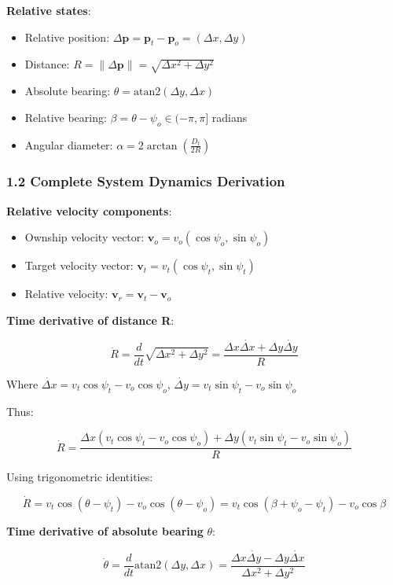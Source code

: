 \documentclass[11pt,a4paper]{article}
\numberwithin{equation}{section}
\begin{document}
\textbf{Relative states}:
\begin{itemize}
\item Relative position: $\Delta\mathbf{p} = \mathbf{p}_t - \mathbf{p}_o = (\Delta x, \Delta y)$
\item Distance: $R = \|\Delta\mathbf{p}\| = \sqrt{\Delta x^2 + \Delta y^2}$
\item Absolute bearing: $\theta = \mathrm{atan2}(\Delta y, \Delta x)$
\item Relative bearing: $\beta = \theta - \psi_o \in (-\pi, \pi]$ radians
\item Angular diameter: $\alpha = 2\arctan\left(\frac{D_t}{2R}\right)$
\end{itemize}

\subsubsection{1.2 Complete System Dynamics Derivation}

\textbf{Relative velocity components}:
\begin{itemize}
\item Ownship velocity vector: $\mathbf{v}_o = v_o(\cos\psi_o, \sin\psi_o)$
\item Target velocity vector: $\mathbf{v}_t = v_t(\cos\psi_t, \sin\psi_t)$
\item Relative velocity: $\mathbf{v}_r = \mathbf{v}_t - \mathbf{v}_o$
\end{itemize}

\textbf{Time derivative of distance R}:

\[
\dot{R} = \frac{d}{dt}\sqrt{\Delta x^2 + \Delta y^2} = \frac{\Delta x \dot{\Delta x} + \Delta y \dot{\Delta y}}{R}
\]

Where $\dot{\Delta x} = v_t\cos\psi_t - v_o\cos\psi_o$, $\dot{\Delta y} = v_t\sin\psi_t - v_o\sin\psi_o$

Thus:

\[
\dot{R} = \frac{\Delta x(v_t\cos\psi_t - v_o\cos\psi_o) + \Delta y(v_t\sin\psi_t - v_o\sin\psi_o)}{R}
\]

Using trigonometric identities:

\[
\dot{R} = v_t\cos(\theta - \psi_t) - v_o\cos(\theta - \psi_o) = v_t\cos(\beta + \psi_o - \psi_t) - v_o\cos\beta
\]

\textbf{Time derivative of absolute bearing} $\theta$:

\[
\dot{\theta} = \frac{d}{dt}\mathrm{atan2}(\Delta y, \Delta x) = \frac{\Delta x\dot{\Delta y} - \Delta y\dot{\Delta x}}{\Delta x^2 + \Delta y^2}
\]
\end{document}
